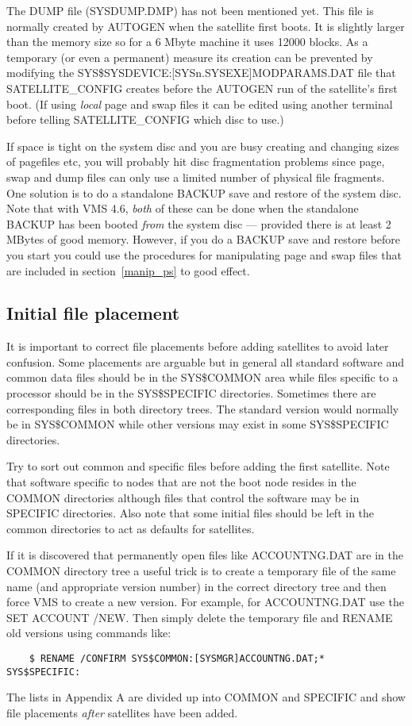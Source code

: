 The DUMP file (SYSDUMP.DMP) has not been mentioned yet.
This file is normally created by AUTOGEN when the satellite first boots.
It is slightly larger than the memory size so for a 6 Mbyte machine it uses
12000 blocks.
As a temporary (or even a permanent) measure its creation can be prevented
by modifying the SYS\$SYSDEVICE:[SYSn.SYSEXE]MODPARAMS.DAT file that
SATELLITE\_CONFIG creates before the AUTOGEN run of the satellite's first boot.
(If using {\em local} page and swap files it can be edited
using another terminal before telling SATELLITE\_CONFIG which disc to use.)

If space is tight on the system disc and you are busy creating and changing
sizes of pagefiles etc, you will probably hit disc fragmentation problems
since page, swap and dump files can only use a limited number of physical
file fragments.
One solution is to do a standalone BACKUP save and restore of the system
disc. Note that with VMS 4.6, {\em both} of these can be done when the
standalone BACKUP has been booted {\em from} the system disc --- provided there
is at least 2 MBytes of good memory.
However, if you do a BACKUP save and restore before you start you could
use the procedures for manipulating page and swap files that are included
in section~\ref{manip_ps} to good effect.

\subsection {Initial file placement}

It is important to correct file placements before adding satellites to avoid
later confusion.
Some placements are arguable but in general all standard software and common
data files should be in the SYS\$COMMON area while files specific to a processor
should be in the SYS\$SPECIFIC directories.
Sometimes there are corresponding files in both directory trees.
The standard version would normally be in SYS\$COMMON while other versions
may exist in some SYS\$SPECIFIC directories.

Try to sort out common and specific files before adding the first satellite.
Note that software specific to nodes that are not the boot node resides
in the COMMON directories although files that control the software may be
in SPECIFIC directories.
Also note that some initial files should be left in the common directories
to act as defaults for satellites.

If it is discovered that permanently open files like ACCOUNTNG.DAT are in the
COMMON directory tree a useful trick is to create a temporary file of the
same name (and appropriate version number) in the correct directory tree
and then force VMS to create a new version.
For example, for ACCOUNTNG.DAT use the SET ACCOUNT /NEW.
Then simply delete the temporary file and RENAME old versions using commands
like:
\begin{verbatim}
    $ RENAME /CONFIRM SYS$COMMON:[SYSMGR]ACCOUNTNG.DAT;*  SYS$SPECIFIC:
\end{verbatim}
The lists in Appendix A are divided up into COMMON and SPECIFIC and show file
placements {\em after} satellites have been added.

